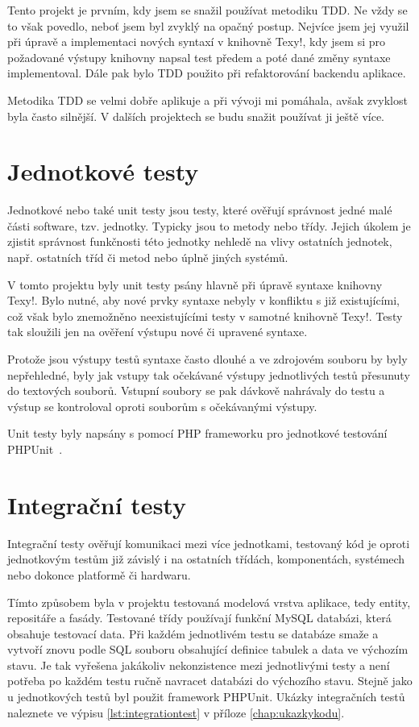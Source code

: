 \documentclass[11pt,twoside,a4paper]{book}
\begin{document}
Tento projekt je prvním, kdy jsem se snažil používat metodiku TDD. Ne vždy se to však povedlo, neboť jsem byl zvyklý na opačný postup. Nejvíce jsem jej využil při úpravě a implementaci nových syntaxí v knihovně Texy!, kdy jsem si pro požadované výstupy knihovny napsal test předem a poté dané změny syntaxe implementoval. Dále pak bylo TDD použito při refaktorování backendu aplikace.

Metodika TDD se velmi dobře aplikuje a při vývoji mi pomáhala, avšak zvyklost byla často silnější. V dalších projektech se budu snažit používat ji ještě více.


\section{Jednotkové testy}
Jednotkové nebo také unit testy jsou testy, které ověřují správnost jedné malé části software, tzv. jednotky. Typicky jsou to metody nebo třídy. Jejich úkolem je zjistit správnost funkčnosti této jednotky nehledě na vlivy ostatních jednotek, např. ostatních tříd či metod nebo úplně jiných systémů.

V tomto projektu byly unit testy psány hlavně při úpravě syntaxe knihovny Texy!. Bylo nutné, aby nové prvky syntaxe nebyly v konfliktu s již existujícími, což však bylo znemožněno neexistujícími testy v samotné knihovně Texy!. Testy tak sloužili jen na ověření výstupu nové či upravené syntaxe.

Protože jsou výstupy testů syntaxe často dlouhé a ve zdrojovém souboru by byly nepřehledné, byly jak vstupy tak očekávané výstupy jednotlivých testů přesunuty do textových souborů. Vstupní soubory se pak dávkově nahrávaly do testu a výstup se kontroloval oproti souborům s očekávanými výstupy.

Unit testy byly napsány s pomocí PHP frameworku pro jednotkové testování PHPUnit~\cite{phpunit}.


\section{Integrační testy}
Integrační testy ověřují komunikaci mezi více jednotkami, testovaný kód je oproti jednotkovým testům již závislý i na ostatních třídách, komponentách, systémech nebo dokonce platformě či hardwaru.

Tímto způsobem byla v projektu testovaná modelová vrstva aplikace, tedy entity, repositáře a fasády. Testované třídy používají funkční MySQL databázi, která obsahuje testovací data. Při každém jednotlivém testu se databáze smaže a vytvoří znovu podle SQL souboru obsahující definice tabulek a data ve výchozím stavu. Je tak vyřešena jakákoliv nekonzistence mezi jednotlivými testy a není potřeba po každém testu ručně navracet databázi do výchozího stavu. Stejně jako u jednotkových testů byl použit framework PHPUnit. Ukázky integračních testů naleznete ve výpisu \ref{lst:integrationtest} v příloze \ref{chap:ukazkykodu}.
\end{document}
